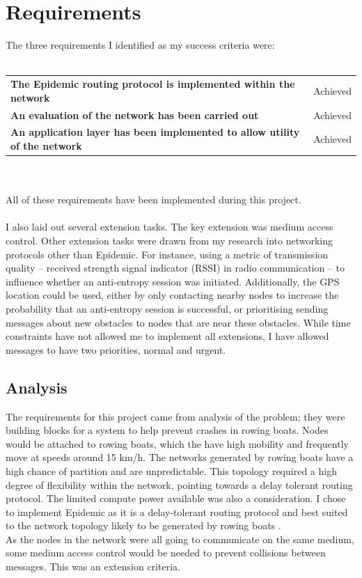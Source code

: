 \documentclass[12pt,a4paper]{report}
\begin{document}
\section{Requirements}
The three requirements I identified as my success criteria were: \\ \\
\begin{tabular}{ll}
\textbf{The Epidemic routing protocol is implemented within the network}    & Achieved \\
\textbf{An evaluation of the network has been carried out}   & Achieved \\
\textbf{An application layer has been implemented to allow utility of the network}  & Achieved \\
\end{tabular} \\ \\
All of these requirements have been implemented during this project. \\ \\ 
I also laid out several extension tasks. The key extension was medium access control. Other extension tasks were drawn from my research into networking protocols other than Epidemic. For instance, using a metric of transmission quality -- received strength signal indicator (RSSI) in radio communication -- to influence whether an anti-entropy session was initiated. Additionally, the GPS location could be used, either by only contacting nearby nodes to increase the probability that an anti-entropy session is successful, or prioritising sending messages about new obstacles to nodes that are near these obstacles. While time constraints have not allowed me to implement all extensions, I have allowed messages to have two priorities, normal and urgent. \\

\subsection{Analysis}
The requirements for this project came from analysis of the problem; they were building blocks for a system to help prevent crashes in rowing boats. Nodes would be attached to rowing boats, which the have high mobility and frequently move at speeds around 15 km/h. The networks generated by rowing boats have a high chance of partition and are unpredictable. This topology required a high degree of flexibility within the network, pointing towards a delay tolerant routing protocol. The limited compute power available was also a consideration. I chose to implement Epidemic as it is a delay-tolerant routing protocol and best suited to the network topology likely to be generated by rowing boats \cite{epidemic}. \\
As the nodes in the network were all going to communicate on the same medium, some medium access control would be needed to prevent collisions between messages. This was an extension criteria. \\
\end{document}
